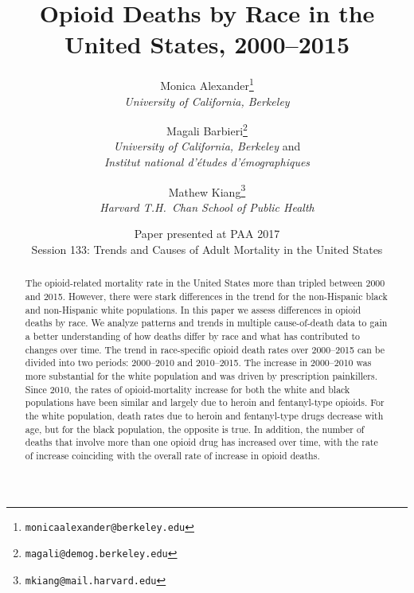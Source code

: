\documentclass[12pt, a4paper]{article}
\begin{document}
\title{\sc Opioid Deaths by Race in the \\ United States, 2000--2015}
\author{Monica Alexander\footnote{\texttt{monicaalexander@berkeley.edu}} \\ \emph{University of California, Berkeley}  \and Magali Barbieri\footnote{\texttt{magali@demog.berkeley.edu}} \\ \emph{University of California, Berkeley} and \\\emph{Institut national d'\'{e}tudes d'\'{e}mographiques} \and Mathew Kiang\footnote{\texttt{mkiang@mail.harvard.edu}} \\ \emph{Harvard T.H.\ Chan School of Public Health}}
\date{Paper presented at PAA 2017 \\ Session 133: Trends and Causes of Adult Mortality in the United States}

\maketitle

\begin{abstract}
The opioid-related mortality rate in the United States more than tripled between 2000 and 2015. However, there were stark differences in the trend for the non-Hispanic black and non-Hispanic white populations. In this paper we assess differences in opioid deaths by race. We analyze patterns and trends in multiple cause-of-death data to gain a better understanding of how deaths differ by race and what has contributed to changes over time. The trend in race-specific opioid death rates over 2000--2015 can be divided into two periods: 2000--2010 and 2010--2015. The increase in 2000--2010 was more substantial for the white population and was driven by prescription painkillers. Since 2010, the rates of opioid-mortality increase for both the white and black populations have been similar and largely due to heroin and fentanyl-type opioids. For the white population, death rates due to heroin and fentanyl-type drugs decrease with age, but for the black population, the opposite is true. In addition, the number of deaths that involve more than one opioid drug has increased over time, with the rate of increase coinciding with the overall rate of increase in opioid deaths. 
\end{abstract}

\setlength\parindent{0pt} 
\setlength{\parskip}{\baselineskip}%

\end{document}
